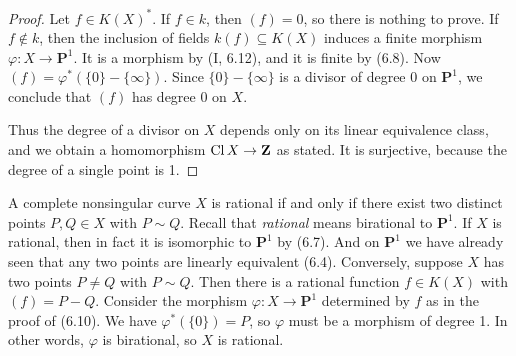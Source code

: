 \begin{proof}
Let $f \in K(X)^*$. If $f \in k$, then $(f) = 0$, so there is nothing to
prove. If $f \notin k$, then the inclusion of fields
$k(f) \subseteq K(X)$ induces a finite morphism
$\varphi\colon X \to \mathbf{P}^1$. It is a morphism by (I, 6.12), and it is
finite by (6.8). Now $(f) = \varphi^*(\{0\} - \{\infty\})$. Since
$\{0\} - \{\infty\}$ is a divisor of degree 0 on $\mathbf{P}^1$, we conclude
that $(f)$ has degree 0 on $X$.

Thus the degree of a divisor on $X$ depends only on its linear equivalence
class, and we obtain a homomorphism $\operatorname{Cl} X \to \mathbf{Z}$ as stated. It is
surjective, because the degree of a single point is 1.
\end{proof}

\begin{example}[6.10.1]
A complete nonsingular curve $X$ is rational if and only if there exist two
distinct points $P,Q \in X$ with $P \sim Q$. Recall that \emph{rational}
means birational to $\mathbf{P}^1$. If $X$ is rational, then in fact it is
isomorphic to $\mathbf{P}^1$ by (6.7). And on $\mathbf{P}^1$ we have already
seen that any two points are linearly equivalent (6.4). Conversely, suppose
$X$ has two points $P \neq Q$ with $P \sim Q$. Then there is a rational
function $f \in K(X)$ with $(f) = P - Q$. Consider the morphism
$\varphi\colon X \to \mathbf{P}^1$ determined by $f$ as in the proof of
(6.10). We have $\varphi^*(\{0\}) = P$, so $\varphi$ must be a morphism of
degree 1. In other words, $\varphi$ is birational, so $X$ is rational.
\end{example}
